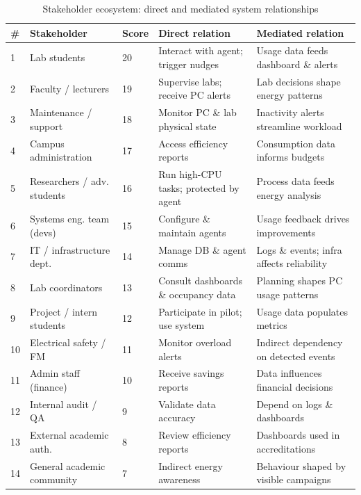 \documentclass[conference]{IEEEtran}
\begin{document}
\begin{table}[t]
\centering
\caption{Stakeholder ecosystem: direct and mediated system relationships}
\label{tab:stakeholders}
\footnotesize
\begin{tabular}{p{0.3cm} p{2.5cm} p{0.3cm} p{1.8cm} p{1.8cm}}
\toprule
\textbf{\#} & \textbf{Stakeholder} & \textbf{Score} & \textbf{Direct relation} & \textbf{Mediated relation} \\
\midrule
1  & Lab students              & 20 & Interact with agent; trigger nudges  & Usage data feeds dashboard \& alerts \\
2  & Faculty / lecturers       & 19 & Supervise labs; receive PC alerts    & Lab decisions shape energy patterns \\
3  & Maintenance / support     & 18 & Monitor PC \& lab physical state     & Inactivity alerts streamline workload \\
4  & Campus administration     & 17 & Access efficiency reports            & Consumption data informs budgets \\
5  & Researchers / adv. students & 16 & Run high-CPU tasks; protected by agent & Process data feeds energy analysis \\
6  & Systems eng. team (devs)  & 15 & Configure \& maintain agents         & Usage feedback drives improvements \\
7  & IT / infrastructure dept. & 14 & Manage DB \& agent comms             & Logs \& events; infra affects reliability \\
8  & Lab coordinators          & 13 & Consult dashboards \& occupancy data & Planning shapes PC usage patterns \\
9  & Project / intern students & 12 & Participate in pilot; use system     & Usage data populates metrics \\
10 & Electrical safety / FM    & 11 & Monitor overload alerts              & Indirect dependency on detected events \\
11 & Admin staff (finance)     & 10 & Receive savings reports              & Data influences financial decisions \\
12 & Internal audit / QA       &  9 & Validate data accuracy               & Depend on logs \& dashboards \\
13 & External academic auth.   &  8 & Review efficiency reports            & Dashboards used in accreditations \\
14 & General academic community &  7 & Indirect energy awareness            & Behaviour shaped by visible campaigns \\

\end{tabular}
\end{table}
\end{document}
